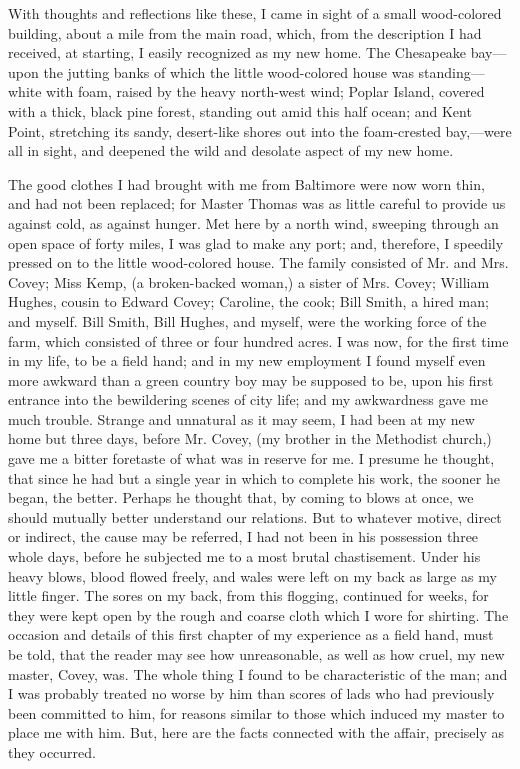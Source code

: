 With thoughts and reflections like these, I came in sight of a small
wood-colored building, about a mile from the main road, which, from the
description I had received, at starting, I easily recognized as my new
home. The Chesapeake bay---upon the jutting banks of which the little
wood-colored house was standing---white with foam, raised by the heavy
north-west wind; Poplar Island, covered with a thick, black pine forest,
standing out amid this half ocean; and Kent Point, stretching its sandy,
desert-like shores out into the foam-crested bay,---were all in sight,
and deepened the wild and desolate aspect of my new home.

The good clothes I had brought with me from Baltimore were now worn
thin, and had not been replaced; for Master Thomas was as little careful
to provide us against cold, as against hunger. Met here by a north wind,
sweeping through an open space of forty miles, I was glad to make any
port; and, therefore, I speedily pressed on to the little wood-colored
house. The family consisted of Mr. and Mrs. Covey; Miss Kemp, (a
broken-backed woman,) a sister of Mrs. Covey; William Hughes, cousin to
Edward Covey; Caroline, the cook; Bill Smith, a hired man; and myself.
Bill Smith, Bill Hughes, and myself, were the working force of the farm,
which consisted of three or four hundred acres. I was now, for the first
time in my life, to be a field hand; and in my new employment I found
myself even more awkward than a green country boy may be supposed to be,
{\protect\hypertarget{208}{}{}}upon his first entrance into the
bewildering scenes of city life; and my awkwardness gave me much
trouble. Strange and unnatural as it may seem, I had been at my new home
but three days, before Mr. Covey, (my brother in the Methodist church,)
gave me a bitter foretaste of what was in reserve for me. I presume he
thought, that since he had but a single year in which to complete his
work, the sooner he began, the better. Perhaps he thought that, by
coming to blows at once, we should mutually better understand our
relations. But to whatever motive, direct or indirect, the cause may be
referred, I had not been in his possession three whole days, before he
subjected me to a most brutal chastisement. Under his heavy blows, blood
flowed freely, and wales were left on my back as large as my little
finger. The sores on my back, from this flogging, continued for weeks,
for they were kept open by the rough and coarse cloth which I wore for
shirting. The occasion and details of this first chapter of my
experience as a field hand, must be told, that the reader may see how
unreasonable, as well as how cruel, my new master, Covey, was. The whole
thing I found to be characteristic of the man; and I was probably
treated no worse by him than scores of lads who had previously been
committed to him, for reasons similar to those which induced my master
to place me with him. But, here are the facts connected with the affair,
precisely as they occurred.

